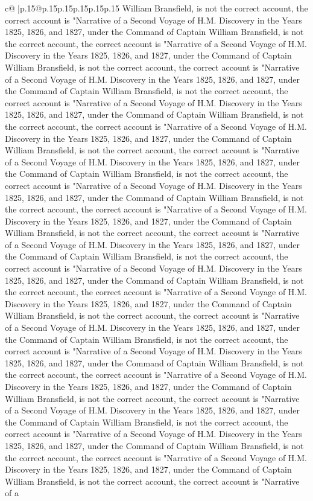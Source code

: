 \documentclass{article}
\begin{document}
{\begin{supertabular}{c@{$\;$}|p{.15\linewidth}@{}p{.15\linewidth}p{.15\linewidth}p{.15\linewidth}p{.15\linewidth}p{.15\linewidth}}
{{{William Bransfield, is not the correct account, the correct account is "Narrative of a Second Voyage of H.M. Discovery in the Years 1825, 1826, and 1827, under the Command of Captain William Bransfield, is not the correct account, the correct account is "Narrative of a Second Voyage of H.M. Discovery in the Years 1825, 1826, and 1827, under the Command of Captain William Bransfield, is not the correct account, the correct account is "Narrative of a Second Voyage of H.M. Discovery in the Years 1825, 1826, and 1827, under the Command of Captain William Bransfield, is not the correct account, the correct account is "Narrative of a Second Voyage of H.M. Discovery in the Years 1825, 1826, and 1827, under the Command of Captain William Bransfield, is not the correct account, the correct account is "Narrative of a Second Voyage of H.M. Discovery in the Years 1825, 1826, and 1827, under the Command of Captain William Bransfield, is not the correct account, the correct account is "Narrative of a Second Voyage of H.M. Discovery in the Years 1825, 1826, and 1827, under the Command of Captain William Bransfield, is not the correct account, the correct account is "Narrative of a Second Voyage of H.M. Discovery in the Years 1825, 1826, and 1827, under the Command of Captain William Bransfield, is not the correct account, the correct account is "Narrative of a Second Voyage of H.M. Discovery in the Years 1825, 1826, and 1827, under the Command of Captain William Bransfield, is not the correct account, the correct account is "Narrative of a Second Voyage of H.M. Discovery in the Years 1825, 1826, and 1827, under the Command of Captain William Bransfield, is not the correct account, the correct account is "Narrative of a Second Voyage of H.M. Discovery in the Years 1825, 1826, and 1827, under the Command of Captain William Bransfield, is not the correct account, the correct account is "Narrative of a Second Voyage of H.M. Discovery in the Years 1825, 1826, and 1827, under the Command of Captain William Bransfield, is not the correct account, the correct account is "Narrative of a Second Voyage of H.M. Discovery in the Years 1825, 1826, and 1827, under the Command of Captain William Bransfield, is not the correct account, the correct account is "Narrative of a Second Voyage of H.M. Discovery in the Years 1825, 1826, and 1827, under the Command of Captain William Bransfield, is not the correct account, the correct account is "Narrative of a Second Voyage of H.M. Discovery in the Years 1825, 1826, and 1827, under the Command of Captain William Bransfield, is not the correct account, the correct account is "Narrative of a Second Voyage of H.M. Discovery in the Years 1825, 1826, and 1827, under the Command of Captain William Bransfield, is not the correct account, the correct account is "Narrative of a Second Voyage of H.M. Discovery in the Years 1825, 1826, and 1827, under the Command of Captain William Bransfield, is not the correct account, the correct account is "Narrative of a Second Voyage of H.M. Discovery in the Years 1825, 1826, and 1827, under the Command of Captain William Bransfield, is not the correct account, the correct account is "Narrative of a }}}
\end{supertabular}}
\end{document}

